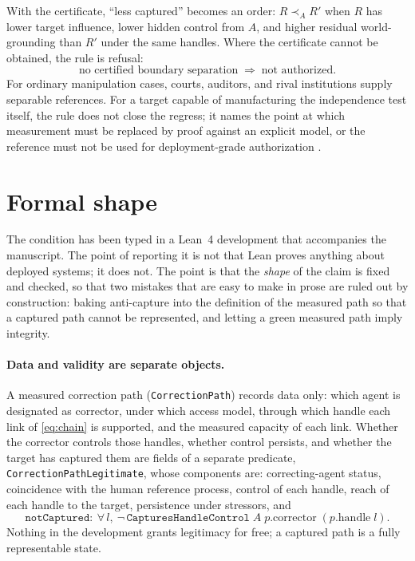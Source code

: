 \documentclass[11pt]{article}
\theoremstyle{remark}
\newcommand{\lean}[1]{\texttt{#1}}
\begin{document}
With the certificate, ``less captured'' becomes an order: $R\prec_A R'$ when $R$ has lower target influence, lower hidden control from $A$, and higher residual world-grounding than $R'$ under the same handles. Where the certificate cannot be obtained, the rule is refusal:
\[
\text{no certified boundary separation}\;\Longrightarrow\;\text{not authorized}.
\]
For ordinary manipulation cases, courts, auditors, and rival institutions supply separable references. For a target capable of manufacturing the independence test itself, the rule does not close the regress; it names the point at which measurement must be replaced by proof against an explicit model, or the reference must not be used for deployment-grade authorization \parencite{dalrymple2024gsai}.

\section{Formal shape}
\label{sec:formal}

The condition has been typed in a Lean~4 development that accompanies the manuscript. The point of reporting it is not that Lean proves anything about deployed systems; it does not. The point is that the \emph{shape} of the claim is fixed and checked, so that two mistakes that are easy to make in prose are ruled out by construction: baking anti-capture into the definition of the measured path so that a captured path cannot be represented, and letting a green measured path imply integrity.

\paragraph{Data and validity are separate objects.}
A measured correction path (\lean{CorrectionPath}) records data only: which agent is designated as corrector, under which access model, through which handle each link of \eqref{eq:chain} is supported, and the measured capacity of each link. Whether the corrector controls those handles, whether control persists, and whether the target has captured them are fields of a separate predicate, \lean{CorrectionPathLegitimate}, whose components are: correcting-agent status, coincidence with the human reference process, control of each handle, reach of each handle to the target, persistence under stressors, and
\[
\lean{notCaptured}:\ \forall\,l,\ \neg\,\lean{CapturesHandleControl}\;A\;p.\mathrm{corrector}\;(p.\mathrm{handle}\;l).
\]
Nothing in the development grants legitimacy for free; a captured path is a fully representable state.
\end{document}
